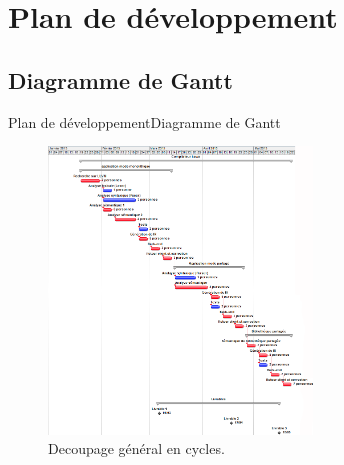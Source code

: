 \section{Plan de développement}
  \subsection{Diagramme de Gantt}
    \begin{frame}{Plan de développement}{Diagramme de Gantt}
      \begin{figure}[!h]
          \includegraphics[width=7cm]{../pdd/fig/decoupage_cycles.png}
          \caption{Decoupage général en cycles.}
          \label{decoupage_cycles}
        \end{figure}
    \end{frame}
